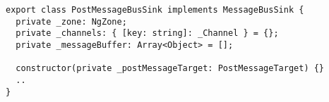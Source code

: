 \begin{verbatim}
export class PostMessageBusSink implements MessageBusSink {
  private _zone: NgZone;
  private _channels: { [key: string]: _Channel } = {};
  private _messageBuffer: Array<Object> = [];

  constructor(private _postMessageTarget: PostMessageTarget) {}
  ..
}
\end{verbatim}
